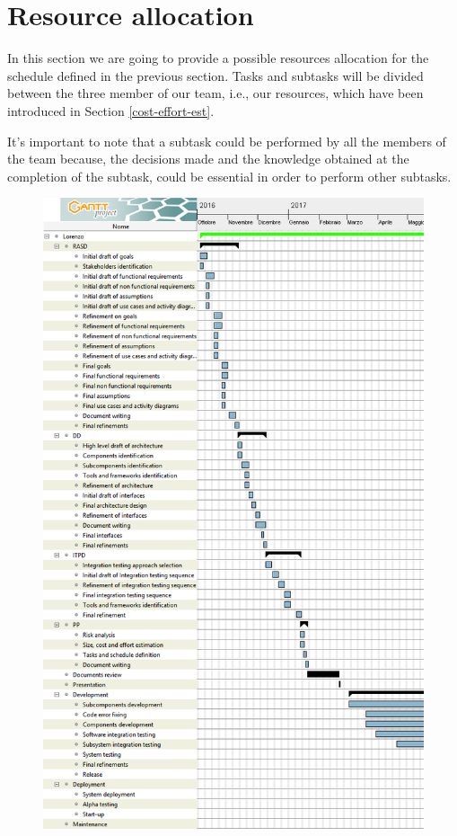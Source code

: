 \section{Resource allocation}

In this section we are going to provide a possible resources allocation for the schedule defined in the previous section. Tasks and subtasks will be divided between the three member of our team, i.e., our resources, which have been introduced in Section \ref{cost-effort-est}.

It's important to note that a subtask could be performed by all the members of the team because, the decisions made and the knowledge obtained at the completion of the subtask, could be essential in order to perform other subtasks.

\begin{figure}[H]
	\centering
	\includegraphics[height=\textheight, keepaspectratio]{resource_allocation/diagrams/ScheduleLorenzo1.png}
\end{figure}

